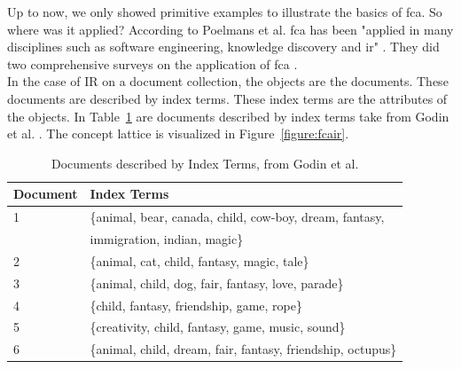 \documentclass[11pt]{report}
\begin{document}
Up to now, we only showed primitive examples to illustrate the basics of \acrshort{fca}. So where was it applied? According to Poelmans et al. \acrshort{fca} has been "applied in many disciplines such as software engineering, knowledge discovery and \acrshort{ir}" \cite{Poelmans2013}. They did two comprehensive surveys on the application of \acrshort{fca} \cite{Poelmans2013, Poelmans2013b}. \\

In the case of IR on a document collection, the objects are the documents. These documents are described by index terms. These index terms are the attributes of the objects. In Table~\ref{table:fcair} are documents described by index terms take from Godin et al. \cite{Godin1993}. The concept lattice is visualized in Figure~\ref{figure:fcair}.

\begin{table}[h]
\caption{Documents described by Index Terms, from Godin et al. \cite{Godin1993}}
\label{table:fcair}
\centering

\def\arraystretch{1.2}%
\begin{tabular}{ | l | l | }
\hline
 Document & Index Terms \\
\hline

1 & \{animal, bear, canada, child, cow-boy, dream, fantasy,\\
  & immigration, indian, magic\} \\
2 & \{animal, cat, child, fantasy, magic, tale\} \\
3 & \{animal, child, dog, fair, fantasy, love, parade\} \\
4 & \{child, fantasy, friendship, game, rope\} \\
5 & \{creativity, child, fantasy, game, music, sound\} \\
6 & \{animal, child, dream, fair, fantasy, friendship, octupus\} \\

\hline
\end{tabular}
\end{table}
\end{document}
